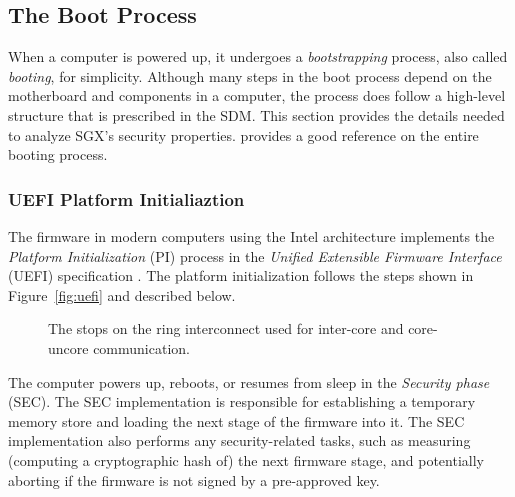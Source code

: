 \subsection{The Boot Process}
\label{sec:booting}

When a computer is powered up, it undergoes a \textit{bootstrapping} process,
also called \textit{booting}, for simplicity. Although many steps in the boot
process depend on the motherboard and components in a computer, the process
does follow a high-level structure that is prescribed in the SDM. This section
provides the details needed to analyze SGX's security properties.
\cite{intel2010booting} provides a good reference on the entire booting
process.

\subsubsection{UEFI Platform Initialiaztion}
\label{sec:efi}

The firmware in modern computers using the Intel architecture implements the
\textit{Platform Initialization} (PI) process in the \textit{Unified
Extensible Firmware Interface} (UEFI) specification \cite{forum2015uefi}. The
platform initialization follows the steps shown in Figure~\ref{fig:uefi} and
described below.

\begin{figure}[hbt]
  \caption{
    The stops on the ring interconnect used for inter-core and core-uncore
    communication.
  }
  \label{fig:cpu_uncore}
\end{figure}

The computer powers up, reboots, or resumes from sleep in the
\textit{Security phase} (SEC). The SEC implementation is responsible for
establishing a temporary memory store and loading the next stage of the
firmware into it. The SEC implementation also performs any security-related
tasks, such as measuring (computing a cryptographic hash of) the next firmware
stage, and potentially aborting if the firmware is not signed by a pre-approved
key.

